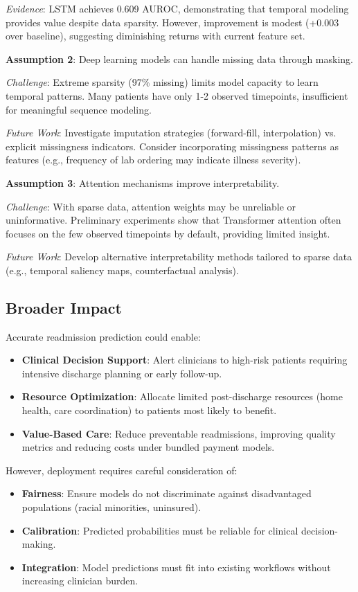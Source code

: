\documentclass[conference]{IEEEtran}
\begin{document}
\textit{Evidence}: LSTM achieves 0.609 AUROC, demonstrating that temporal modeling provides value despite data sparsity. However, improvement is modest (+0.003 over baseline), suggesting diminishing returns with current feature set.

\textbf{Assumption 2}: Deep learning models can handle missing data through masking.

\textit{Challenge}: Extreme sparsity (97\% missing) limits model capacity to learn temporal patterns. Many patients have only 1-2 observed timepoints, insufficient for meaningful sequence modeling.

\textit{Future Work}: Investigate imputation strategies (forward-fill, interpolation) vs. explicit missingness indicators. Consider incorporating missingness patterns as features (e.g., frequency of lab ordering may indicate illness severity).

\textbf{Assumption 3}: Attention mechanisms improve interpretability.

\textit{Challenge}: With sparse data, attention weights may be unreliable or uninformative. Preliminary experiments show that Transformer attention often focuses on the few observed timepoints by default, providing limited insight.

\textit{Future Work}: Develop alternative interpretability methods tailored to sparse data (e.g., temporal saliency maps, counterfactual analysis).

\subsection{Broader Impact}

Accurate readmission prediction could enable:
\begin{itemize}
    \item \textbf{Clinical Decision Support}: Alert clinicians to high-risk patients requiring intensive discharge planning or early follow-up.
    \item \textbf{Resource Optimization}: Allocate limited post-discharge resources (home health, care coordination) to patients most likely to benefit.
    \item \textbf{Value-Based Care}: Reduce preventable readmissions, improving quality metrics and reducing costs under bundled payment models.
\end{itemize}

However, deployment requires careful consideration of:
\begin{itemize}
    \item \textbf{Fairness}: Ensure models do not discriminate against disadvantaged populations (racial minorities, uninsured).
    \item \textbf{Calibration}: Predicted probabilities must be reliable for clinical decision-making.
    \item \textbf{Integration}: Model predictions must fit into existing workflows without increasing clinician burden.
\end{itemize}
\end{document}
